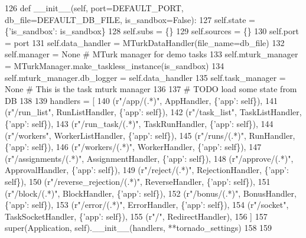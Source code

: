 \begin{DoxyCode}
126     \textcolor{keyword}{def }\_\_init\_\_(self, port=DEFAULT\_PORT, db\_file=DEFAULT\_DB\_FILE, is\_sandbox=False):
127         self.state = \{\textcolor{stringliteral}{'is\_sandbox'}: is\_sandbox\}
128         self.subs = \{\}
129         self.sources = \{\}
130         self.port = port
131         self.data\_handler = MTurkDataHandler(file\_name=db\_file)
132         self.manager = \textcolor{keywordtype}{None}  \textcolor{comment}{# MTurk manager for demo tasks}
133         self.mturk\_manager = MTurkManager.make\_taskless\_instance(is\_sandbox)
134         self.mturk\_manager.db\_logger = self.data\_handler
135         self.task\_manager = \textcolor{keywordtype}{None}  \textcolor{comment}{# This is the task mturk manager}
136 
137         \textcolor{comment}{# TODO load some state from DB}
138 
139         handlers = [
140             (\textcolor{stringliteral}{r"/app/(.*)"}, AppHandler, \{\textcolor{stringliteral}{'app'}: self\}),
141             (\textcolor{stringliteral}{r"/run\_list"}, RunListHandler, \{\textcolor{stringliteral}{'app'}: self\}),
142             (\textcolor{stringliteral}{r"/task\_list"}, TaskListHandler, \{\textcolor{stringliteral}{'app'}: self\}),
143             (\textcolor{stringliteral}{r"/run\_task/(.*)"}, TaskRunHandler, \{\textcolor{stringliteral}{'app'}: self\}),
144             (\textcolor{stringliteral}{r"/workers"}, WorkerListHandler, \{\textcolor{stringliteral}{'app'}: self\}),
145             (\textcolor{stringliteral}{r"/runs/(.*)"}, RunHandler, \{\textcolor{stringliteral}{'app'}: self\}),
146             (\textcolor{stringliteral}{r"/workers/(.*)"}, WorkerHandler, \{\textcolor{stringliteral}{'app'}: self\}),
147             (\textcolor{stringliteral}{r"/assignments/(.*)"}, AssignmentHandler, \{\textcolor{stringliteral}{'app'}: self\}),
148             (\textcolor{stringliteral}{r"/approve/(.*)"}, ApprovalHandler, \{\textcolor{stringliteral}{'app'}: self\}),
149             (\textcolor{stringliteral}{r"/reject/(.*)"}, RejectionHandler, \{\textcolor{stringliteral}{'app'}: self\}),
150             (\textcolor{stringliteral}{r"/reverse\_rejection/(.*)"}, ReverseHandler, \{\textcolor{stringliteral}{'app'}: self\}),
151             (\textcolor{stringliteral}{r"/block/(.*)"}, BlockHandler, \{\textcolor{stringliteral}{'app'}: self\}),
152             (\textcolor{stringliteral}{r"/bonus/(.*)"}, BonusHandler, \{\textcolor{stringliteral}{'app'}: self\}),
153             (\textcolor{stringliteral}{r"/error/(.*)"}, ErrorHandler, \{\textcolor{stringliteral}{'app'}: self\}),
154             (\textcolor{stringliteral}{r"/socket"}, TaskSocketHandler, \{\textcolor{stringliteral}{'app'}: self\}),
155             (\textcolor{stringliteral}{r"/"}, RedirectHandler),
156         ]
157         super(Application, self).\_\_init\_\_(handlers, **tornado\_settings)
158 
159 
\end{DoxyCode}


